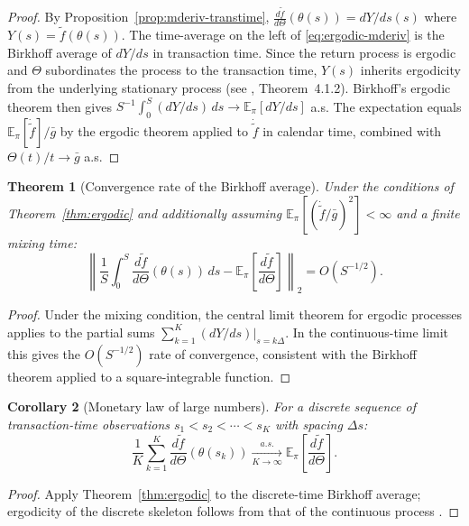 \documentclass[twocolumn,11pt,a4paper]{article}
\theoremstyle{thmstyle}
\newtheorem{theorem}{Theorem}[section]
\newtheorem{corollary}[theorem]{Corollary}
\theoremstyle{definition}
\theoremstyle{remark}
\newcommand{\Clock}{\Theta}                  %
\newcommand{\InvClock}{\theta}               %
\newcommand{\Mdiff}[1]{\frac{d#1}{d\Clock}} %
\newcommand{\Expect}{\mathbb{E}}
\begin{document}
\begin{proof}
By Proposition~\ref{prop:mderiv-transtime},
$\Mdiff{\tilde{f}}(\InvClock(s)) = dY/ds(s)$ where
$Y(s)=\tilde{f}(\InvClock(s))$.  The time-average on the
left of \eqref{eq:ergodic-mderiv} is the Birkhoff average
of $dY/ds$ in transaction time.  Since the return process
is ergodic and $\Clock$ subordinates the process to the
transaction time, $Y(s)$ inherits ergodicity from the
underlying stationary process (see \citealt{Revuz1999},
Theorem~4.1.2).  Birkhoff's ergodic theorem then gives
$S^{-1}\int_{0}^{S}(dY/ds)\,ds\to\Expect_{\pi}[dY/ds]$ a.s.
The expectation equals $\Expect_{\pi}[\dot{\tilde{f}}]/\bar{g}$
by the ergodic theorem applied to $\dot{\tilde{f}}$ in
calendar time, combined with $\Clock(t)/t\to\bar{g}$ a.s.
\end{proof}

\begin{theorem}[Convergence rate of the Birkhoff average]
\label{thm:clt-mderiv}
Under the conditions of Theorem~\ref{thm:ergodic} and
additionally assuming $\Expect_{\pi}[(\dot{\tilde{f}}/\bar{g})^{2}]
<\infty$ and a finite mixing time:
\begin{equation}\label{eq:clt-rate}
  \left\|
    \frac{1}{S}\int_{0}^{S}\Mdiff{\tilde{f}}(\InvClock(s))\,ds
    - \Expect_{\pi}\!\left[\Mdiff{\tilde{f}}\right]
  \right\|_{2}
  = O(S^{-1/2}).
\end{equation}
\end{theorem}

\begin{proof}
Under the mixing condition, the central limit theorem for
ergodic processes \citep{Billingsley1999} applies to the
partial sums $\sum_{k=1}^{K}(dY/ds)|_{s=k\Delta}$.  In
the continuous-time limit this gives the $O(S^{-1/2})$
rate of convergence, consistent with the Birkhoff theorem
applied to a square-integrable function.
\end{proof}

\begin{corollary}[Monetary law of large numbers]\label{cor:mlln}
For a discrete sequence of transaction-time observations
$s_{1}<s_{2}<\cdots<s_{K}$ with spacing $\Delta s$:
\begin{equation}
  \frac{1}{K}\sum_{k=1}^{K}
  \Mdiff{\tilde{f}}(\InvClock(s_{k}))
  \xrightarrow[K\to\infty]{a.s.}
  \Expect_{\pi}\!\left[\Mdiff{\tilde{f}}\right].
\end{equation}
\end{corollary}

\begin{proof}
Apply Theorem~\ref{thm:ergodic} to the discrete-time
Birkhoff average; ergodicity of the discrete skeleton
follows from that of the continuous process
\citep{MeynTweedie1993}.
\end{proof}
\end{document}
